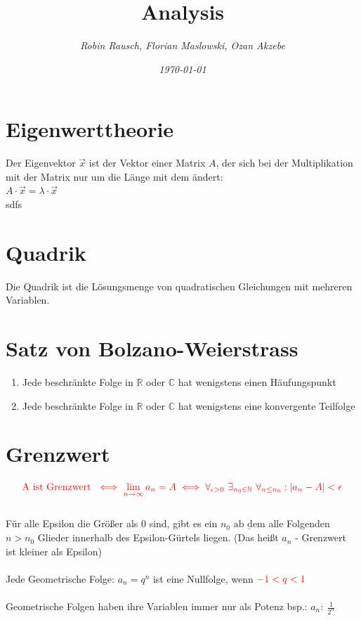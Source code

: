 \documentclass[12pt,a4paper]{article}
\author{\slshape Robin Rausch, Florian Maslowski, Ozan Akzebe}
\title{Analysis}
\date{\slshape \today}
\begin{document}
\maketitle
\tableofcontents
\newpage
\section{Eigenwerttheorie}
	Der Eigenvektor $\overrightarrow{x} $ ist der Vektor einer Matrix $A$, der sich bei der Multiplikation mit der Matrix
	nur um die Länge mit dem ändert:\\
	\Large $A \cdot \overrightarrow{x} = \lambda \cdot \overrightarrow{x} $\\
	\normalsize sdfs


\section{Quadrik}   
    Die Quadrik ist die Lösungsmenge von quadratischen Gleichungen mit mehreren Variablen.
	
\section{Satz von Bolzano-Weierstrass}
	\begin{enumerate}
		\item Jede beschränkte Folge in $\mathbb{R}$ oder $\mathbb{C}$ hat wenigstens einen Häufungspunkt
  		\item Jede beschränkte Folge in $\mathbb{R}$ oder $\mathbb{C}$ hat wenigstens eine konvergente Teilfolge
	\end{enumerate}


\section{Grenzwert}
	$$\color{red}\text{A ist Grenzwert } \iff \lim_{n\rightarrow\infty}{a_{n}=A} \iff\forall_{\epsilon>0}~\exists_{n_{0}\in\mathbb{N}} ~\forall_{n \leq n_{0}}: | a     		_{n}-A | < \epsilon$$\\
	Für alle Epsilon die Größer als 0 sind, gibt es ein $n_{0}$ $\underline{\text{ab dem}}$ alle Folgenden $n>n_{0}$ Glieder innerhalb des Epsilon-Gürtels liegen. (Das 		heißt $a_{n}$ - Grenzwert ist kleiner 	als Epsilon)\\\\
	Jede Geometrische Folge: $a_{n}=q^{n}$ ist eine Nullfolge, wenn $\color{red}-1<q<1$\\\\
	Geometrische Folgen haben ihre Variablen immer nur als Potenz bsp.: $a_{n}:~\frac{1}{2^{n}}$
	
\end{document}

